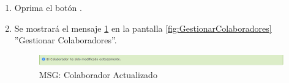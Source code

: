\begin{enumerate}
			\item Oprima el botón \IUAceptar.
			
			\item Se mostrará el mensaje \ref{fig:colaboradorEditado} en la pantalla \ref{fig:GestionarColaboradores} ''Gestionar Colaboradores''.
			
			\begin{figure}[htbp!]
				\begin{center}
					\includegraphics[scale=0.6]{roles/administrador/colaboradores/gestionarColaboradores/pantallas/IU3-2MSG1}
					\caption{MSG: Colaborador Actualizado}
					\label{fig:colaboradorEditado}
				\end{center}
			\end{figure}
			\end{enumerate}